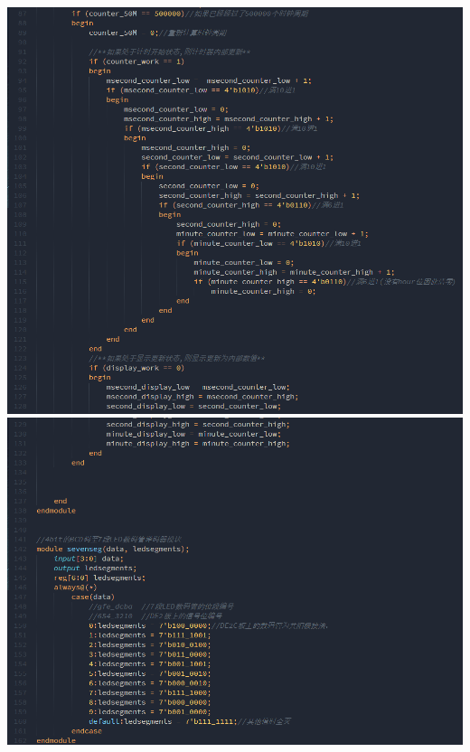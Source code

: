 \documentclass{article}
\begin{document}
    \newline
    \includegraphics[width=\textwidth]{87-128.png}
    \newline
    \includegraphics[width=\textwidth]{129-162.png}
\end{document}
